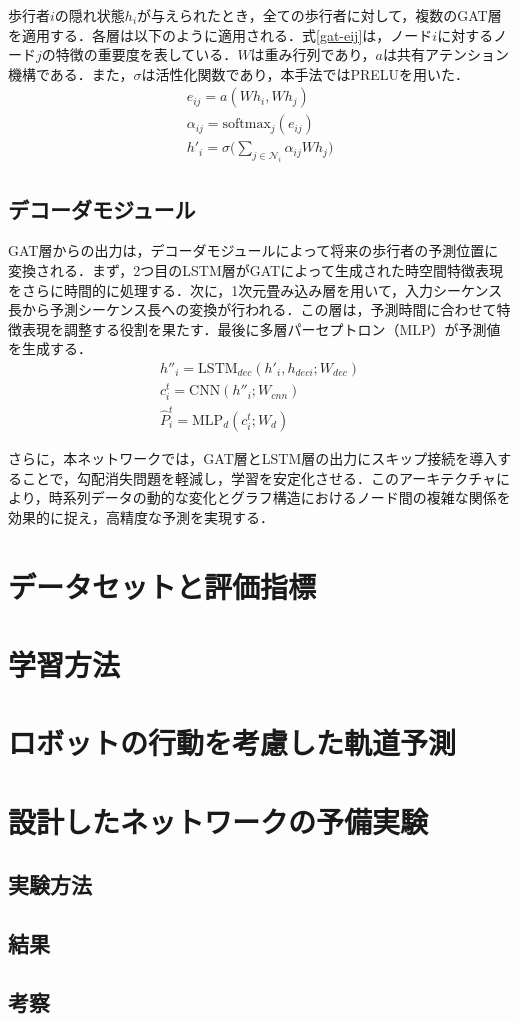 歩行者$i$の隠れ状態$h_i$が与えられたとき，全ての歩行者に対して，複数のGAT層を適用する．各層は以下のように適用される．式\eqref{gat-eij}は，ノード$i$に対するノード$j$の特徴の重要度を表している．$W$は重み行列であり，$a$は共有アテンション機構である．また，$\sigma$は活性化関数であり，本手法ではPRELU\cite{prelu}を用いた．
\begin{align}
  e_{ij} = a(Wh_i, Wh_j) \label{gat-eij} \\
  \alpha_{ij} = \text{softmax}_{j}(e_{ij}) \\
  h'_i = \sigma\Bigg(\sum_{j \in \mathcal{N}_i} \alpha_{ij}Wh_j \Bigg)
\end{align}

\subsection{デコーダモジュール}
GAT層からの出力は，デコーダモジュールによって将来の歩行者の予測位置に変換される．まず，2つ目のLSTM層がGATによって生成された時空間特徴表現をさらに時間的に処理する．次に，1次元畳み込み層を用いて，入力シーケンス長から予測シーケンス長への変換が行われる．この層は，予測時間に合わせて特徴表現を調整する役割を果たす．最後に多層パーセプトロン（MLP）が予測値を生成する．
\begin{align}
  h''_i = \text{LSTM}_{dec}(h'_i, h_{deci}; W_{dec})\\
  c^t_i = \text{CNN}(h''_i; W_{cnn}) \\
  \hat{P}^t_i = \text{MLP}_{d}(c^t_i; W_{d})
\end{align}

さらに，本ネットワークでは，GAT層とLSTM層の出力にスキップ接続を導入することで，勾配消失問題を軽減し，学習を安定化させる．このアーキテクチャにより，時系列データの動的な変化とグラフ構造におけるノード間の複雑な関係を効果的に捉え，高精度な予測を実現する．

\section{データセットと評価指標}

\section{学習方法}

\section{ロボットの行動を考慮した軌道予測}

\section{設計したネットワークの予備実験}

\subsection{実験方法}
\subsection{結果}
\subsection{考察}

\newpage
